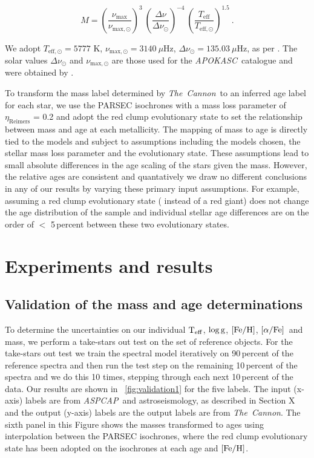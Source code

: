 \documentclass[12pt, preprint]{aastex}
\newcommand{\project}[1]{\textsl{#1}}
\newcommand{\tc}{\project{The~Cannon}}
\newcommand{\apokasc}{\project{APOKASC}}
\newcommand{\aspcap}{\project{ASPCAP}}
\newcommand{\teff}{\mbox{$\rm T_{eff}$}}
\newcommand{\feh}{\mbox{$\rm [Fe/H]$}}
\newcommand{\alphafe}{\mbox{$\rm [\alpha/Fe]$}}
\newcommand{\logg}{\mbox{$\rm \log g$}}
\begin{document}
\begin{equation} \label{eq:mass}
M= \left( \frac{\nu_{\mathrm{max}}}{\nu_{\mathrm{max,\odot}}}\right)^3\  \left( \frac{\Delta \nu}{\Delta \nu_{\odot}}\right)^{-4} \ \left( \frac{T_{\mathrm{eff}}}{T_{\mathrm{eff,\odot}}}\right)^{1.5} \ .
\end{equation}
\label{scaling}


We adopt  $T_{\mathrm{eff,\odot}}=5777$ K, $\nu_{\mathrm{max,\odot}}=3140\ \mu$Hz, $\Delta \nu_{\odot}=135.03\ \mu$Hz, as per \citet{Martig2014}. The solar values  $\Delta \nu_{\odot}$ and $\nu_{\mathrm{max,\odot}}$ are those used for the \apokasc\ catalogue and were obtained by \cite{Hekker2013}.

To transform the mass label determined by \tc\ to an inferred age label for each star, we use the PARSEC isochrones \citep{Bressan2012} with a mass loss parameter of $\eta_{\mbox{Reimers}}$ = 0.2 and adopt the red clump evolutionary state to set the relationship between mass and age at each metallicity.  The mapping of mass to age is directly tied to the models and subject to assumptions including the models chosen, the stellar mass loss parameter and the evolutionary state. These assumptions lead to small absolute differences in the age scaling of the stars given the mass. However,  the relative ages are consistent and quantatively we draw no different conclusions in any of our results by varying these primary input assumptions. For example, assuming a red clump evolutionary state ( instead of a red giant) does not change the age distribution of the sample and individual stellar age differences are on the order of $<$ 5\,percent between these two evolutionary states. 

\section{Experiments and results}

\subsection{Validation of the mass and age determinations}

To determine the uncertainties on our individual \teff, \logg, \feh, \alphafe\ and mass, we perform a take-stars out test on the set of reference objects.
For the take-stars out test we train the spectral model iteratively on 90\,percent of the reference spectra and then run the test step on the remaining 10\,percent of the spectra and we do this 10 times, stepping through each next 10\,percent of the data. Our results are shown in \figurename~\ref{fig:validation1} for the five labels. The input (x-axis) labels are from \aspcap\ and astroseismology, as described in Section X and the output (y-axis) labels are the output labels are from \tc.  The sixth panel in this Figure shows the masses transformed to ages using interpolation between the PARSEC isochrones, where the red clump evolutionary state has been adopted on the isochrones at each age and \feh. 
\end{document}
